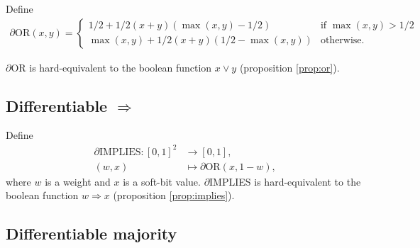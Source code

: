 \documentclass{article} %
\begin{document}
Define 
\begin{equation*}
\begin{aligned}
\partial\text{OR}(x, y) =
\begin{cases}
1/2 + 1/2(x + y)(\operatorname{max}(x,y) - 1/2) & \text{if } \operatorname{max}(x,y) > 1/2 \\
\operatorname{max}(x,y) + 1/2(x + y)(1/2 - \operatorname{max}(x,y)) & \text{otherwise.}
\end{cases}
\end{aligned}
\end{equation*}

$\partial${OR} is hard-equivalent to the boolean function $x \vee y$ (proposition \ref{prop:or}).

\subsection{Differentiable $\Rightarrow$}

Define
\begin{equation*}
\begin{aligned}
\partial\text{IMPLIES}: [0,1]^{2} &\to [0,1],\\
(w, x) &\mapsto \partial\text{OR}(x, 1-w)\text{,}
\end{aligned}
\end{equation*}
where $w$ is a weight and $x$ is a soft-bit value.
$\partial${IMPLIES} is hard-equivalent to the boolean function $w \Rightarrow x$ (proposition \ref{prop:implies}).

\subsection{Differentiable majority}
\end{document}

